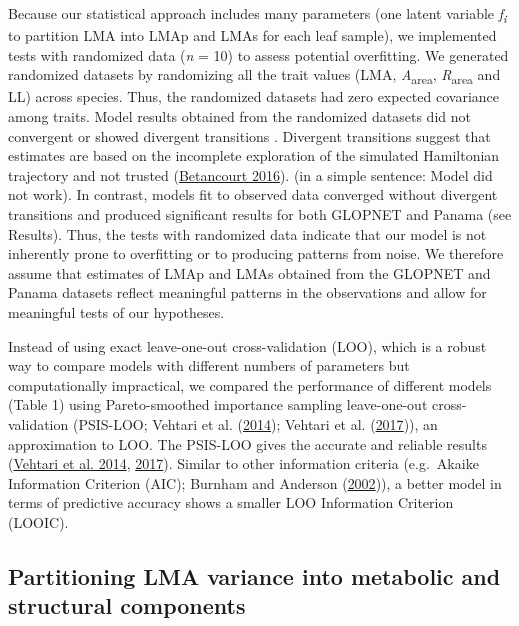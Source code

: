 \documentclass[
  12pt,
  a4paper,
,tablecaptionabove
]{scrartcl}
\providecommand{\DIFaddtex}[1]{{\protect\color{blue}\uwave{#1}}} %
\providecommand{\DIFaddbegin}{} %
\providecommand{\DIFaddend}{} %
\providecommand{\DIFadd}[1]{\texorpdfstring{\DIFaddtex{#1}}{#1}} %
\newcommand{\DIFaddincludegraphics}[2][]{{\color{blue}\fbox{\DIFOincludegraphics[#1]{#2}}}} %
\DeclareRobustCommand{\DIFaddbegin}{\DIFOaddbegin \let\includegraphics\DIFaddincludegraphics} %
\DeclareRobustCommand{\DIFaddend}{\DIFOaddend \let\includegraphics\DIFOincludegraphics} %
\begin{document}
Because our statistical approach includes many parameters (one latent
variable \emph{f\textsubscript{i}} to partition LMA into LMAp and LMAs
for each leaf sample), we implemented tests with randomized data
(\emph{n} = 10) to assess potential overfitting. We generated randomized
datasets by randomizing all the trait values (LMA,
\emph{A}\textsubscript{area}, \emph{R}\textsubscript{area} and LL)
across species. Thus, the randomized datasets had zero expected
covariance among traits. Model results obtained from the randomized
datasets did not convergent or showed divergent transitions \DIFaddbegin \DIFadd{(Appendix
S2)}\DIFaddend . Divergent transitions suggest that estimates are based on the
incomplete exploration of the simulated Hamiltonian trajectory and not
trusted (\protect\hyperlink{ref-Betancourt2016}{Betancourt 2016}). (in a
simple sentence: Model did not work). In contrast, models fit to
observed data converged without divergent transitions and produced
significant results for both GLOPNET and Panama (see Results). Thus, the
tests with randomized data indicate that our model is not inherently
prone to overfitting or to producing patterns from noise. We therefore
assume that estimates of LMAp and LMAs obtained from the GLOPNET and
Panama datasets reflect meaningful patterns in the observations and
allow for meaningful tests of our hypotheses.

Instead of using exact leave-one-out cross-validation (LOO), which is a
robust way to compare models with different numbers of parameters but
computationally impractical, we compared the performance of different
models (Table 1) using Pareto-smoothed importance sampling leave-one-out
cross-validation (PSIS-LOO; Vehtari et al.
(\protect\hyperlink{ref-Vehtari2014}{2014}); Vehtari et al.
(\protect\hyperlink{ref-Vehtari2017}{2017})), an approximation to LOO.
The PSIS-LOO gives the accurate and reliable results
(\protect\hyperlink{ref-Vehtari2014}{Vehtari et al. 2014},
\protect\hyperlink{ref-Vehtari2017}{2017}). Similar to other information
criteria (e.g.~Akaike Information Criterion (AIC); Burnham and Anderson
(\protect\hyperlink{ref-Burnham2002}{2002})), a better model in terms of
predictive accuracy shows a smaller LOO Information Criterion (LOOIC).

\hypertarget{partitioning-lma-variance-into-metabolic-and-structural-components}{%
\subsection{Partitioning LMA variance into metabolic and structural
components}\label{partitioning-lma-variance-into-metabolic-and-structural-components}}
\end{document}
